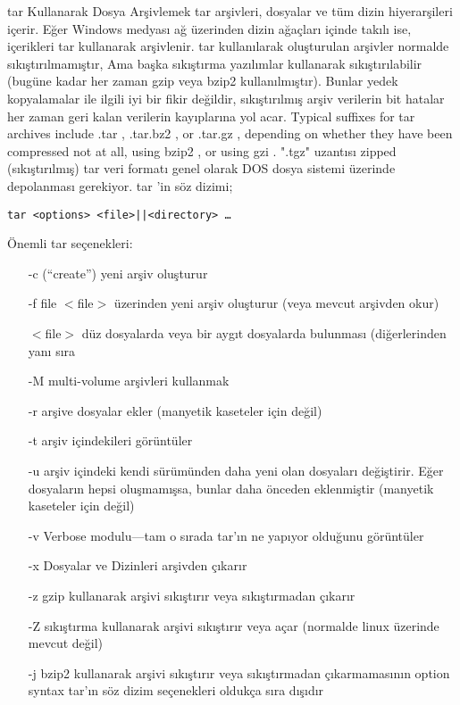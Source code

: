 \begin{section}{tar Kullanarak Dosya Arşivlemek}
tar arşivleri, dosyalar ve tüm dizin hiyerarşileri içerir. Eğer Windows medyası ağ üzerinden dizin ağaçları içinde takılı ise, içerikleri tar kullanarak arşivlenir. tar kullanılarak oluşturulan arşivler normalde sıkıştırılmamıştır, Ama başka sıkıştırma yazılımlar kullanarak sıkıştırılabilir (bugüne kadar her zaman gzip veya bzip2 kullanılmıştır). Bunlar yedek kopyalamalar ile ilgili iyi bir fikir değildir, sıkıştırılmış arşiv verilerin bit hatalar her zaman geri kalan verilerin kayıplarına yol acar. Typical suffixes for tar archives include .tar , .tar.bz2 , or .tar.gz , depending on whether they have been compressed not at all, using bzip2 , or using gzi . ".tgz" uzantısı zipped (sıkıştırılmış) tar veri formatı genel olarak DOS dosya sistemi üzerinde depolanması gerekiyor. tar ’in söz dizimi;
\begin{verbatim}
tar <options> <file>||<directory> …
\end{verbatim}
Önemli tar seçenekleri:
\begin{itemize}
\item[-c (“create”)]yeni arşiv oluşturur
\item[-f file]$<$file$>$ üzerinden yeni arşiv oluşturur (veya mevcut arşivden okur)
\item[$<$file$>$]düz dosyalarda veya bir aygıt dosyalarda bulunması (diğerlerinden yanı sıra
\item[-M]multi-volume arşivleri kullanmak
\item[-r]arşive dosyalar ekler (manyetik kaseteler için değil)
\item[-t]arşiv içindekileri görüntüler
\item[-u]arşiv içindeki kendi sürümünden daha yeni olan dosyaları değiştirir. Eğer dosyaların hepsi oluşmamışsa, bunlar daha önceden eklenmiştir (manyetik kaseteler için değil)
\item[-v]Verbose modulu—tam o sırada tar'ın ne yapıyor olduğunu görüntüler
\item[-x]Dosyalar ve Dizinleri arşivden çıkarır
\item[-z]gzip kullanarak arşivi sıkıştırır veya sıkıştırmadan çıkarır
\item[-Z]sıkıştırma kullanarak arşivi sıkıştırır veya açar (normalde linux üzerinde mevcut değil)
\item[-j]bzip2 kullanarak arşivi sıkıştırır veya sıkıştırmadan çıkarmamasının option syntax tar'ın söz dizim seçenekleri oldukça sıra dışıdır
\item[]
\item[]
\end{itemize}


\end{section}
